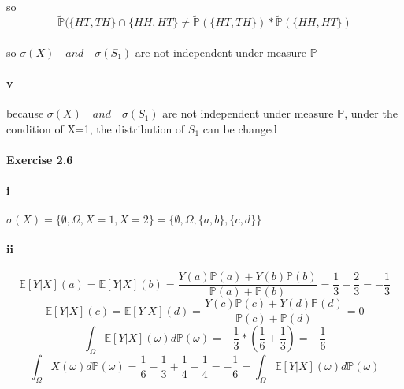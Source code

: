 \documentclass{article}
\begin{document}
{\paragraph{}{so\begin{displaymath}
                 \tilde{\mathbb{P}}(\{HT,TH\}\cap\{HH,HT\}\neq\tilde{\mathbb{P}}(\{HT,TH\})*\tilde{\mathbb{P}}(\{HH,HT\})
               \end{displaymath}}
\paragraph{}{so $\sigma(X)\quad and\quad \sigma(S_{1})$ are not independent under measure $\mathbb{P}$ }

\paragraph{v}{because $\sigma(X)\quad and\quad \sigma(S_{1})$ are not independent under measure $\mathbb{P}$, under the condition of X=1, the distribution of $S_{1}$ can be changed  }
\paragraph{Exercise 2.6}
\paragraph{i}{$\sigma(X)=\{\emptyset,\Omega,X=1,X=2\}=\{\emptyset,\Omega,\{a,b\},\{c,d\}\}$}
\paragraph{ii}{}
\begin{displaymath}
  \mathbb{E}[Y|X](a)=\mathbb{E}[Y|X](b)=\frac{Y(a)\mathbb{P}(a)+Y(b)\mathbb{P}(b)}{\mathbb{P}(a)+\mathbb{P}(b)}=\frac{1}{3}-\frac{2}{3}=-\frac{1}{3}
\end{displaymath}
\begin{displaymath}
  \mathbb{E}[Y|X](c)=\mathbb{E}[Y|X](d)=\frac{Y(c)\mathbb{P}(c)+Y(d)\mathbb{P}(d)}{\mathbb{P}(c)+\mathbb{P}(d)}=0
\end{displaymath}
\begin{displaymath}
\int_{\Omega}^{}\mathbb{E}[Y|X](\omega)d\mathbb{P}(\omega)=-\frac{1}{3}*(\frac{1}{6}+\frac{1}{3})=-\frac{1}{6}
\end{displaymath}
\begin{displaymath}
  \int_{\Omega}^{}X(\omega)d\mathbb{P}(\omega)=\frac{1}{6}-\frac{1}{3}+\frac{1}{4}-\frac{1}{4}=-\frac{1}{6}=\int_{\Omega}^{}\mathbb{E}[Y|X](\omega)d\mathbb{P}(\omega)
\end{displaymath}
}
\end{document}
